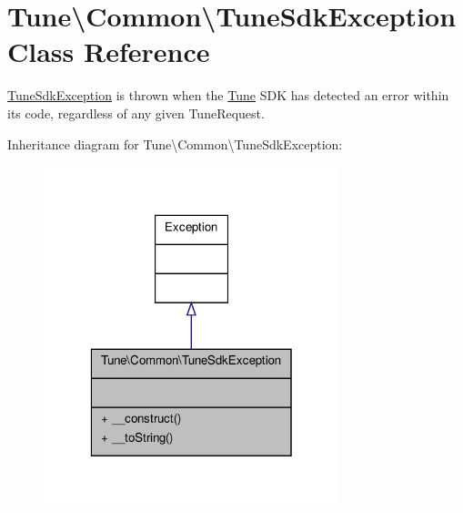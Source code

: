 \hypertarget{classTune_1_1Common_1_1TuneSdkException}{\section{Tune\textbackslash{}Common\textbackslash{}Tune\-Sdk\-Exception Class Reference}
\label{classTune_1_1Common_1_1TuneSdkException}
}


\hyperlink{classTune_1_1Common_1_1TuneSdkException}{Tune\-Sdk\-Exception} is thrown when the \hyperlink{namespaceTune}{Tune} S\-D\-K has detected an error within its code, regardless of any given Tune\-Request.  




Inheritance diagram for Tune\textbackslash{}Common\textbackslash{}Tune\-Sdk\-Exception\-:
\nopagebreak
\begin{figure}[H]
\begin{center}
\leavevmode
\includegraphics[width=244pt]{classTune_1_1Common_1_1TuneSdkException__inherit__graph}
\end{center}
\end{figure}


